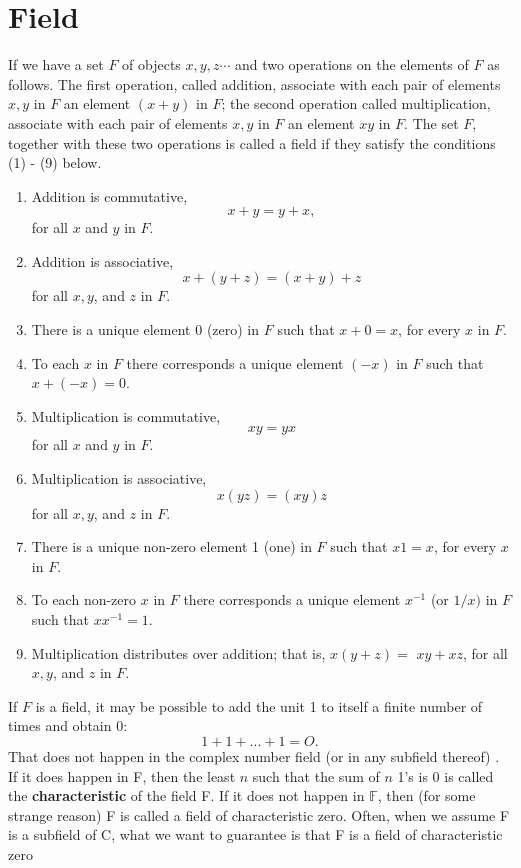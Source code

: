 \documentclass[main.tex]{subfiles}
\begin{document}
\section{Field}
\begin{definition}
    

If we have a set $F$ of objects $x, y, z \cdots$ and two operations on the elements of $F$ as follows. The first operation, called addition, associate with each pair of elements $x, y$ in $F$ an element $(x + y)$ in $F$; the second operation called multiplication, associate with each pair of elements $x, y$ in $F$ an element $xy$ in $F$. The set $F$, together with these two operations is called a field if they satisfy the conditions (1) - (9) below. 
\begin{enumerate}
    \item Addition is commutative,
$$
x+y=y+x,
$$
for all $x$ and $y$ in $F$.
\item Addition is associative,
$$
x+(y+z)=(x+y)+z
$$
for all $x, y$, and $z$ in $F$.
\item There is a unique element 0 (zero) in $F$ such that $x+0=x$, for every $x$ in $F$.
\item To each $x$ in $F$ there corresponds a unique element $(-x)$ in $F$ such that $x+(-x)=0$.
\item Multiplication is commutative,
$$
x y=y x
$$
for all $x$ and $y$ in $F$.
\item Multiplication is associative,
$$
x(y z)=(x y) z
$$
for all $x, y$, and $z$ in $F$.
\item There is a unique non-zero element 1 (one) in $F$ such that $x 1=x$, for every $x$ in $F$.
\item To each non-zero $x$ in $F$ there corresponds a unique element $x^{-1}$ (or $1 / x)$ in $F$ such that $x x^{-1}=1$.
\item Multiplication distributes over addition; that is, $x(y+z)=$ $x y+x z$, for all $x, y$, and $z$ in $F$.
\end{enumerate}
\end{definition}
\begin{definition}
If $F$ is a field, it may be possible to add the unit 1 to itself a finite number of times and obtain 0:
\begin{equation}
1 + 1 + . . . + 1  = O.
\end{equation}
That does not happen in the complex number field (or in any subfield thereof) . If it does happen in F, then the least $n$ such that the sum of $n$ 1's is 0 is called the \textbf{characteristic} of the field F. If it does not happen
in $\mathbb{F}$, then (for some strange reason) F is called a field of characteristic
zero. Often, when we assume F is a subfield of C, what we want to guarantee
is that F is a field of characteristic zero
\end{definition}
\end{document}
